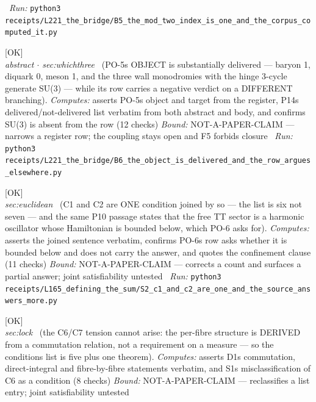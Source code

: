 \begin{description}
\ \emph{Run:} \texttt{python3 receipts/L221\_the\_bridge/B5\_the\_mod\_two\_index\_is\_one\_and\_the\_corpus\_computed\_it.py}
\item[\label{rcpt:B6_the_object_is_delivered_and_the_row_argues_elsewhere}\texttt{B6\_the\_object\_is\_delivered\_and\_the\_row\_argues\_elsewhere}]\hfill\textsf{[OK]}\\
\textit{abstract \ensuremath{\cdot} sec:whichthree} \ (PO-5s OBJECT is substantially delivered --- baryon 1, diquark 0, meson 1, and the three wall monodromies with the hinge 3-cycle generate SU(3) --- while its row carries a negative verdict on a DIFFERENT branching). 
\emph{Computes:} asserts PO-5s object and target from the register, P14s delivered/not-delivered list verbatim from both abstract and body, and confirms SU(3) is absent from the row (12 checks)
 \emph{Bound:} NOT-A-PAPER-CLAIM --- narrows a register row; the coupling stays open and F5 forbids closure
\ \emph{Run:} \texttt{python3 receipts/L221\_the\_bridge/B6\_the\_object\_is\_delivered\_and\_the\_row\_argues\_elsewhere.py}
\item[\label{rcpt:S2_c1_and_c2_are_one_and_the_source_answers_more}\texttt{S2\_c1\_and\_c2\_are\_one\_and\_the\_source\_answers\_more}]\hfill\textsf{[OK]}\\
\textit{sec:euclidean} \ (C1 and C2 are ONE condition joined by so --- the list is six not seven --- and the same P10 passage states that the free TT sector is a harmonic oscillator whose Hamiltonian is bounded below, which PO-6 asks for). 
\emph{Computes:} asserts the joined sentence verbatim, confirms PO-6s row asks whether it is bounded below and does not carry the answer, and quotes the confinement clause (11 checks)
 \emph{Bound:} NOT-A-PAPER-CLAIM --- corrects a count and surfaces a partial answer; joint satisfiability untested
\ \emph{Run:} \texttt{python3 receipts/L165\_defining\_the\_sum/S2\_c1\_and\_c2\_are\_one\_and\_the\_source\_answers\_more.py}
\item[\label{rcpt:S3_c6_is_a_theorem_not_a_condition}\texttt{S3\_c6\_is\_a\_theorem\_not\_a\_condition}]\hfill\textsf{[OK]}\\
\textit{sec:lock} \ (the C6/C7 tension cannot arise: the per-fibre structure is DERIVED from a commutation relation, not a requirement on a measure --- so the conditions list is five plus one theorem). 
\emph{Computes:} asserts D1s commutation, direct-integral and fibre-by-fibre statements verbatim, and S1s misclassification of C6 as a condition (8 checks)
 \emph{Bound:} NOT-A-PAPER-CLAIM --- reclassifies a list entry; joint satisfiability untested

\end{description}
